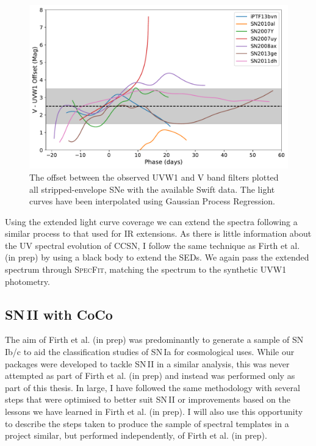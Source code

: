 \begin{figure}
  \centering
  \includegraphics[width=\textwidth]{Figures/Chapter4/VOffset_Ibc}
  \caption{The offset between the observed UVW1 and V band filters plotted all stripped-envelope SNe with the available Swift data. The light curves have been interpolated using Gaussian Process Regression.}
  \label{fig:VvsUVW1}
\end{figure}

Using the extended light curve coverage we can extend the spectra following a similar process to that used for IR extensions. As there is little information about the UV spectral evolution of CCSN, I follow the same technique as Firth et al. (in prep) by using a black body to extend the SEDs. We again pass the extended spectrum through \textsc{SpecFit}, matching the spectrum to the synthetic UVW1 photometry.

\subsection{SN\,II with CoCo}
The aim of Firth et al. (in prep) was predominantly to generate a sample of SN\,Ib/c to aid the classification studies of SN\,Ia for cosmological uses. While our packages were developed to tackle SN\,II in a similar analysis, this was never attempted as part of Firth et al. (in prep) and instead was performed only as part of this thesis. In large, I have followed the same methodology with several steps that were optimised to better suit SN\,II or improvements based on the lessons we have learned in Firth et al. (in prep). I will also use this opportunity to describe the steps taken to produce the sample of spectral templates in a project similar, but performed independently, of Firth et al. (in prep).

